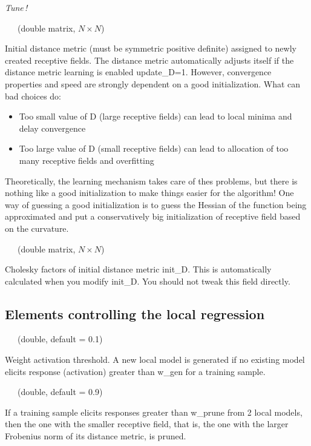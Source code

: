 \documentclass[11pt,a4paper]{article}
\newenvironment{element}[2]%
{{\large\sf #1}~~~(#2)\begin{list}{}%
{\setlength{\leftmargin}{0.5cm}\setlength{\topsep}{0.2cm}}%
\item[]%
}
{\end{list}}
\newcommand{\tune}{\hspace*{-1.5cm}\parbox{1.5cm}{\emph{Tune\,!}}}
\begin{document}
\tune\begin{element}{init\_D}{double matrix, $N\times N$}
Initial distance metric (must be symmetric positive definite) assigned
to newly created receptive fields. The distance metric automatically
adjusts itself if the distance metric learning is enabled 
{\sf update\_D=1}. However, convergence properties and speed are
strongly dependent on a good initialization. What can bad
choices do:\begin{itemize}
\item Too small value of {\sf D} (large receptive fields) can
lead to local minima and delay convergence
\item Too large value of {\sf D} (small receptive fields) can
lead to allocation of too many receptive fields and overfitting
\end{itemize}
Theoretically, the learning mechanism takes care of thes problems,
but there is nothing like a good initialization to make things
easier for the algorithm! One way of guessing a good initialization
is to guess the Hessian of the function being approximated and put
a conservatively big initialization of receptive field based on
the curvature.
\end{element}

\begin{element}{init\_M}{double matrix, $N\times N$}
Cholesky factors of initial distance metric {\sf init\_D}. This is
automatically calculated when you modify {\sf init\_D}. You should
not tweak this field directly.
\end{element}

\subsection{Elements controlling the local regression}

\begin{element}{w\_gen}{double, default = 0.1}
Weight activation threshold. A new local model is generated if no 
existing model elicits response (activation) greater than {\sf w\_gen}
for a training sample.
\end{element}

\begin{element}{w\_prune}{double, default = 0.9}
If a training sample elicits responses greater than {\sf w\_prune}
from 2 local models, then the one with the smaller receptive field,
that is, the one with the larger Frobenius norm of its distance 
metric, is pruned.
\end{element}
\end{document}

